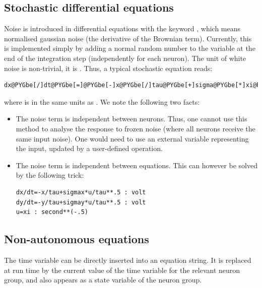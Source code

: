 \documentclass[letterpaper,10pt,english]{manual}
\begin{document}
\subsection{Stochastic differential equations}

Noise is introduced in differential equations with the keyword
, which means normalised gaussian noise (the derivative of the Brownian term).
Currently, this is implemented simply by adding a normal random number to the variable
at the end of the integration step (independently for each neuron).
The unit of white noise is non-trivial, it is . Thus, a typical stochastic
equation reads:

\begin{Verbatim}[commandchars=@\[\]]
dx@PYGbe[/]dt@PYGbe[=]@PYGbe[-]x@PYGbe[/]tau@PYGbe[+]sigma@PYGbe[*]xi@PYGbe[/]tau@PYGbe[*]@PYGbe[*]@PYGbe[.]@PYGaw[5]
\end{Verbatim}

where  is in the same units as . We note the following two facts:
\begin{itemize}
\item {} 
The noise term is independent between neurons. Thus, one cannot use this method to analyse
the response to frozen noise (where all neurons receive the same input noise). One would need
to use an external variable representing the input, updated by a user-defined operation.

\item {} 
The noise term is independent between equations. This can however be solved by the following
trick:

\begin{Verbatim}[commandchars=@\[\]]
dx/dt=-x/tau+sigmax*u/tau**.5 : volt
dy/dt=-y/tau+sigmay*u/tau**.5 : volt
u=xi : second**(-.5)
\end{Verbatim}

\end{itemize}

\subsection{Non-autonomous equations}

The time variable  can be directly inserted into an equation string.
It is replaced at run time by the current value of the time variable for the relevant
neuron group, and also appears as a state variable of the neuron group.
\end{document}
